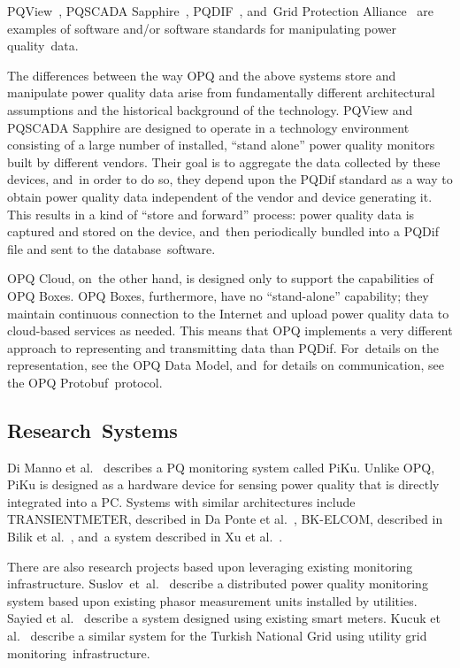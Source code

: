 \documentclass[energies,article,accept,moreauthors,pdftex]{Definitions/mdpi}
\begin{document}
PQView~\cite{electrotek_concepts_pqview_2020}, PQSCADA Sapphire~\cite{elspec_ltd_pqscada_2016}, PQDIF~\cite{sabin_ieee_2020}, and~Grid Protection Alliance~\cite{grid_protection_alliance_grid_2020} are examples of software and/or software standards for manipulating power quality~data.

The differences between the way OPQ and the above systems store and manipulate power quality data arise from fundamentally different architectural assumptions and the historical background of the technology. PQView and PQSCADA Sapphire are designed to operate in a technology environment consisting of a large number of installed, “stand alone” power quality monitors built by different vendors. Their goal is to aggregate the data collected by these devices, and~in order to do so, they depend upon the PQDif standard as a way to obtain power quality data independent of the vendor and device generating it. This results in a kind of “store and forward” process: power quality data is captured and stored on the device, and~then periodically bundled into a PQDif file and sent to the database~software.

OPQ Cloud, on~the other hand, is designed only to support the capabilities of OPQ Boxes. OPQ Boxes, furthermore, have no “stand-alone” capability; they maintain continuous connection to the Internet and upload power quality data to cloud-based services as needed. This means that OPQ implements a very different approach to representing and transmitting data than PQDif. For~details on the representation, see the OPQ Data Model, and~for details on communication, see the OPQ Protobuf~protocol.

\subsection{Research~Systems}

Di Manno et al.~\cite{di_manno_user_2015} describes a PQ monitoring system called PiKu. Unlike OPQ, PiKu is designed as a hardware device for sensing power quality that is directly integrated into a PC. Systems with similar architectures include TRANSIENTMETER, described in Da Ponte et al.~\cite{daponte_transientmeter:_2000}, BK-ELCOM, described in Bilik et al.~\cite{bilik_modular_2007}, and~a system described in Xu et al.~\cite{xu_distributed_2012}.

There are also research projects based upon leveraging existing monitoring infrastructure. \mbox{Suslov et al.~\cite{suslov_distributed_2014}} describe a distributed power quality monitoring system based upon existing phasor measurement units installed by utilities. Sayied et al.~\cite{sayied_power_2013} describe a system designed using existing smart meters. Kucuk et al.~\cite{kucuk_extensible_2010} describe a similar system for the Turkish National Grid using utility grid monitoring~infrastructure.
\end{document}
